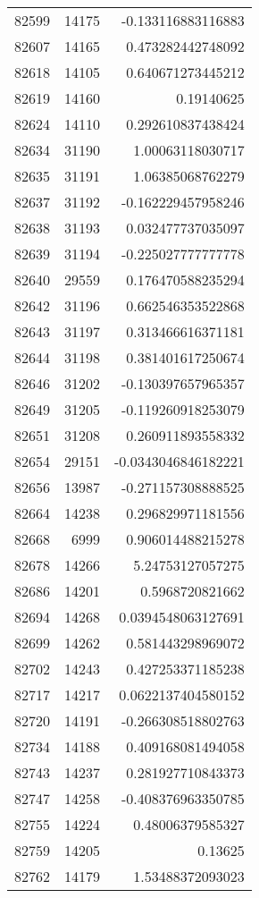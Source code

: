 \begin{tabular}{r | r | r}
82599 & 14175 & -0.133116883116883 \\
82607 & 14165 & 0.473282442748092 \\
82618 & 14105 & 0.640671273445212 \\
82619 & 14160 & 0.19140625 \\
82624 & 14110 & 0.292610837438424 \\
82634 & 31190 & 1.00063118030717 \\
82635 & 31191 & 1.06385068762279 \\
82637 & 31192 & -0.162229457958246 \\
82638 & 31193 & 0.032477737035097 \\
82639 & 31194 & -0.225027777777778 \\
82640 & 29559 & 0.176470588235294 \\
82642 & 31196 & 0.662546353522868 \\
82643 & 31197 & 0.313466616371181 \\
82644 & 31198 & 0.381401617250674 \\
82646 & 31202 & -0.130397657965357 \\
82649 & 31205 & -0.119260918253079 \\
82651 & 31208 & 0.260911893558332 \\
82654 & 29151 & -0.0343046846182221 \\
82656 & 13987 & -0.271157308888525 \\
82664 & 14238 & 0.296829971181556 \\
82668 & 6999 & 0.906014488215278 \\
82678 & 14266 & 5.24753127057275 \\
82686 & 14201 & 0.5968720821662 \\
82694 & 14268 & 0.0394548063127691 \\
82699 & 14262 & 0.581443298969072 \\
82702 & 14243 & 0.427253371185238 \\
82717 & 14217 & 0.0622137404580152 \\
82720 & 14191 & -0.266308518802763 \\
82734 & 14188 & 0.409168081494058 \\
82743 & 14237 & 0.281927710843373 \\
82747 & 14258 & -0.408376963350785 \\
82755 & 14224 & 0.48006379585327 \\
82759 & 14205 & 0.13625 \\
82762 & 14179 & 1.53488372093023 \\

\end{tabular}
